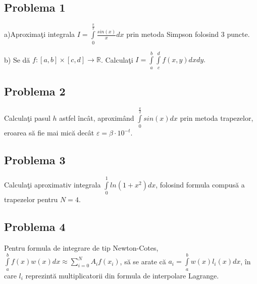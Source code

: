 \documentclass{exam}
\begin{document}
\subsection{Problema 1}
a)Aproxima\c{t}i integrala $ I=\int\limits_0^{\frac{\pi}{2}}\frac{sin(x)}{x}dx $ prin metoda Simpson folosind 3 puncte.

b) Se d\u{a} $f:[a,b]\times[c,d]\rightarrow\mathbb{R}$. Calcula\c{t}i $I=\int\limits_a^b\int\limits_c^df(x,y)dxdy.$

\subsection{Problema 2}
Calcula\c{t}i pasul $h$ astfel \^{i}nc\^{a}t, aproxim\^{a}nd $\int\limits_0^{\frac{\pi}{2}}sin(x)dx$ prin metoda trapezelor, eroarea s\u{a} fie mai mic\u{a} dec\^{a}t $\varepsilon=\beta\cdot 10^{-t}$.

\subsection{Problema 3}
Calcula\c{t}i aproximativ integrala $\int\limits_0^1ln(1+x^2)dx$, folosind formula compus\u{a} a trapezelor pentru $N=4$.

\subsection{Problema 4}
Pentru formula de integrare de tip Newton-Cotes, $\int\limits_a^bf(x)w(x)dx\approx\sum\limits_{i=0}^{N}A_if(x_i)$, s\u{a} se arate c\u{a}  $a_i=\int\limits_a^bw(x)l_i(x)dx$, \^{i}n care $l_i$ reprezint\u{a} multiplicatorii din formula de interpolare Lagrange.
\end{document}
